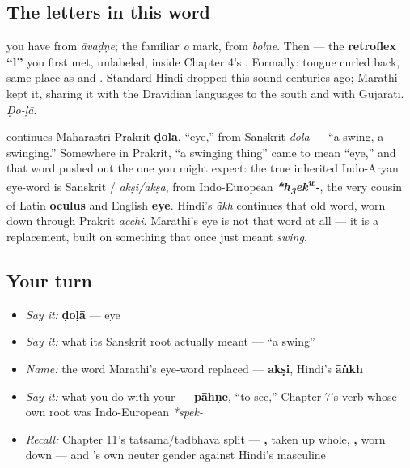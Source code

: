 \subsection*{The letters in this word}
\textbf{} you have from \emph{āvaḍṇe}; \textbf{} the familiar \emph{o} mark, from \emph{bolṇe}. Then \textbf{} — the \textbf{retroflex \textquotedblleft{}l\textquotedblright{}} you first met, unlabeled, inside Chapter 4's \textbf{}. Formally: tongue curled back, same place as \textbf{} and \textbf{}. Standard Hindi dropped this sound centuries ago; Marathi kept it, sharing it with the Dravidian languages to the south and with Gujarati. \emph{Ḍo-ḷā}.

\begin{cousinweb}
\textbf{} continues Maharastri Prakrit \textbf{ḍola}, \textquotedblleft{}eye,\textquotedblright{} from Sanskrit \textbf{} \emph{dola} — \textquotedblleft{}a swing, a swinging.\textquotedblright{} Somewhere in Prakrit, \textquotedblleft{}a swinging thing\textquotedblright{} came to mean \textquotedblleft{}eye,\textquotedblright{} and that word pushed out the one you might expect: the true inherited Indo-Aryan eye-word is Sanskrit \textbf{}/\textbf{} \emph{akṣi/akṣa}, from Indo-European \emph{\textbf{*h\textsubscript{3}ek\textsuperscript{w}-}}, the very cousin of Latin \textbf{oculus} and English \textbf{eye}. Hindi's \textbf{} \emph{ā̃kh} continues that old word, worn down through Prakrit \emph{acchi}. Marathi's eye is not that word at all — it is a replacement, built on something that once just meant \emph{swing}.
\end{cousinweb}

\subsection*{Your turn}
\begin{itemize}
\raggedright
  \item \emph{Say it:} \textbf{ḍoḷā} — eye
  \item \emph{Say it:} what its Sanskrit root actually meant — \textquotedblleft{}a swing\textquotedblright{}
  \item \emph{Name:} the word Marathi's eye-word replaced — \textbf{akṣi}, Hindi's \textbf{āṅkh}
  \item \emph{Say it:} what you do with your \textbf{} — \textbf{pāhṇe}, \textquotedblleft{}to see,\textquotedblright{} Chapter 7's verb whose own root was Indo-European \emph{*spek-}
  \item \emph{Recall:} Chapter 11's tatsama/tadbhava split — \textbf{, } taken up whole, \textbf{, } worn down — and \textbf{}'s own neuter gender against Hindi's masculine
\end{itemize}

